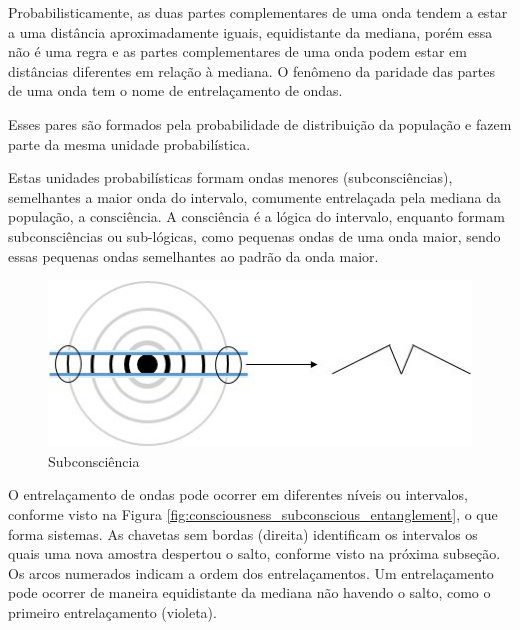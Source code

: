 Probabilisticamente, as duas partes complementares de uma onda tendem a estar a uma distância aproximadamente iguais, equidistante da mediana, porém essa não é uma regra e as partes complementares de uma onda podem estar em distâncias diferentes em relação à mediana. O fenômeno da paridade das partes de uma onda tem o nome de entrelaçamento de ondas.

Esses pares são formados pela probabilidade de distribuição da população e fazem parte da mesma unidade probabilística. 

Estas unidades probabilísticas formam ondas menores (subconsciências), semelhantes a maior onda do intervalo, comumente entrelaçada pela mediana da população, a consciência. A consciência é a lógica do intervalo, enquanto formam subconsciências ou sub-lógicas, como pequenas ondas de uma onda maior, sendo essas pequenas ondas semelhantes ao padrão da onda maior.
	\begin{figure}[H]
	\caption{Subconsciência}
	\label{fig:consciousness_subconscious}
	\centering
	\includegraphics[scale=.8]{sections/images/consciousness_subconscious.jpg}
	\end{figure}
	
O entrelaçamento de ondas pode ocorrer em diferentes níveis ou intervalos, conforme visto na Figura \ref{fig:consciousness_subconscious_entanglement}, o que forma sistemas. As chavetas sem bordas (direita) identificam os intervalos os quais uma nova amostra despertou o salto, conforme visto na próxima subseção. Os arcos numerados indicam a ordem dos entrelaçamentos. Um entrelaçamento pode ocorrer de maneira equidistante da mediana não havendo o salto, como o primeiro entrelaçamento (violeta).

